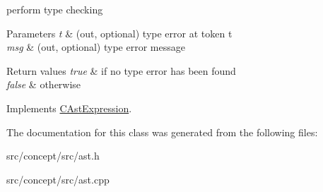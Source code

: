 perform type checking 


\begin{DoxyParams}{Parameters}
{\em t} & (out, optional) type error at token t \\
\hline
{\em msg} & (out, optional) type error message \\
\hline
\end{DoxyParams}

\begin{DoxyRetVals}{Return values}
{\em true} & if no type error has been found \\
\hline
{\em false} & otherwise \\
\hline
\end{DoxyRetVals}


Implements \hyperlink{classCAstExpression_a301baee7d5f700085371b706db8a3a56}{C\-Ast\-Expression}.



The documentation for this class was generated from the following files\-:\begin{DoxyCompactItemize}
\item 
src/concept/src/ast.\-h\item 
src/concept/src/ast.\-cpp\end{DoxyCompactItemize}
